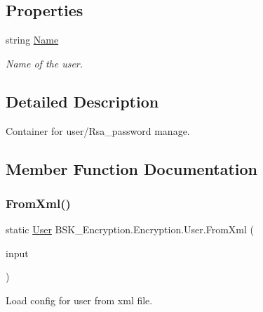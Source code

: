 \subsection*{Properties}
\begin{DoxyCompactItemize}
\item 
string \mbox{\hyperlink{class_b_s_k___encryption_1_1_encryption_1_1_user_a00edfd3ff33285f11bc3dfdb2657f2a9}{Name}}
\begin{DoxyCompactList}\small\item\em Name of the user. \end{DoxyCompactList}\end{DoxyCompactItemize}


\subsection{Detailed Description}
Container for user/\+Rsa\+\_\+password manage. 



\subsection{Member Function Documentation}
\mbox{\label{class_b_s_k___encryption_1_1_encryption_1_1_user_ae5f1c5220e3588843a0cd2850d8bf61a}} 
\subsubsection{\texorpdfstring{From\+Xml()}{FromXml()}}
{\footnotesize\ttfamily static \mbox{\hyperlink{class_b_s_k___encryption_1_1_encryption_1_1_user}{User}} B\+S\+K\+\_\+\+Encryption.\+Encryption.\+User.\+From\+Xml (\begin{DoxyParamCaption}\item[{Xml\+Reader}]{input }\end{DoxyParamCaption})\hspace{0.3cm}{\ttfamily [static]}}



Load config for user from xml file. 


